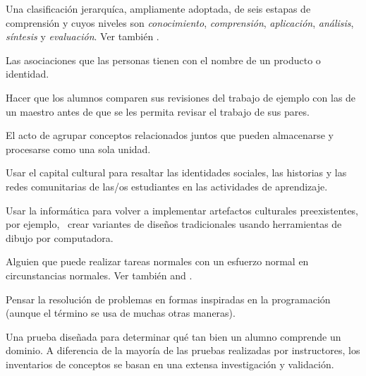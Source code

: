 \begin{description}
 Una clasificación jerarquíca, ampliamente adoptada, 
de seis estapas de comprensión y cuyos niveles son \emph{conocimiento},
\emph{comprensión}, \emph{aplicación}, \emph{análisis}, \emph{síntesis} y
\emph{evaluación}. 
Ver también .

 Las asociaciones que las personas tienen con el nombre de un producto o
identidad.

 Hacer que los alumnos comparen sus 
revisiones del trabajo de ejemplo con las de un maestro antes de que 
se les permita revisar el trabajo de sus pares.

 El acto de agrupar conceptos relacionados juntos
que pueden almacenarse y procesarse como una sola unidad.













 Usar el capital cultural 
para resaltar las identidades sociales, las historias y las redes comunitarias de 
las/os estudiantes en las actividades de aprendizaje.

 Usar la informática 
para volver a implementar artefactos culturales preexistentes, por ejemplo, 
\ crear variantes de diseños tradicionales usando herramientas de dibujo por computadora.


 Alguien que puede 
realizar tareas normales con un esfuerzo normal en circunstancias normales. Ver también
 and .

 Pensar la
resolución de problemas en formas inspiradas en la programación (aunque el término se usa de muchas
otras maneras).

 Una prueba diseñada para determinar 
qué tan bien un alumno comprende un dominio. A diferencia de la mayoría de las pruebas realizadas por instructores, 
los inventarios de conceptos se basan en una extensa investigación y validación.


\end{description}
